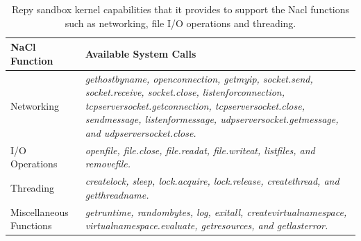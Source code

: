 \begin{table}
\centering
\caption {Repy sandbox kernel capabilities that it
provides to support the Nacl functions such as networking, file I/O operations and threading.}

  \begin{tabular}{ | p{2.5cm} | p{4.5cm} |}
 \hline
  \textbf{NaCl Function} & \textbf{Available System Calls}  \\ \hline
    
Networking & \emph{gethostbyname, openconnection, getmyip, socket.send, socket.receive, socket.close, listenforconnection, tcpserversocket.getconnection, tcpserversocket.close, sendmessage, listenformessage, udpserversocket.getmessage, and udpserversocket.close.} \\ \hline
 
I/O Operations & \emph{openfile, file.close, file.readat, file.writeat, listfiles, and removefile.} \\ \hline

Threading & \emph{createlock, sleep, lock.acquire, lock.release, createthread, and getthreadname.} \\ \hline   

Miscellaneous Functions & \emph{getruntime, randombytes, log, exitall, createvirtualnamespace, virtualnamespace.evaluate, getresources, and getlasterror.}  \\ \hline
    \end{tabular}
    \label{table:RepyKernel}
\end{table}

